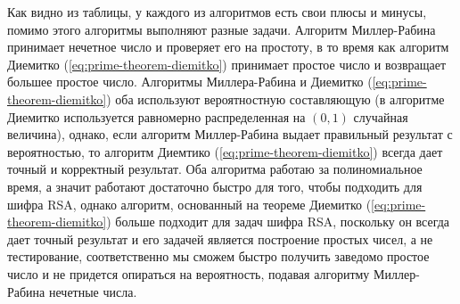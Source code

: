   Как видно из таблицы, у каждого из алгоритмов есть свои плюсы и минусы, помимо этого алгоритмы выполняют разные задачи. Алгоритм Миллер-Рабина принимает нечетное число и проверяет его на простоту, в то время как алгоритм Диемитко (\ref{eq:prime-theorem-diemitko}) принимает простое число и возвращает большее простое число. Алгоритмы Миллера-Рабина и Диемитко (\ref{eq:prime-theorem-diemitko}) оба используют вероятностную составляющую (в алгоритме Диемитко используется равномерно распределенная на $(0,1)$ случайная величина), однако, если алгоритм Миллер-Рабина выдает правильный результат с вероятностью, то алгоритм Диемтико (\ref{eq:prime-theorem-diemitko}) всегда дает точный и корректный результат. Оба алгоритма работаю за полиномиальное время, а значит работают достаточно быстро для того, чтобы подходить для шифра RSA, однако алгоритм, основанный на теореме Диемитко (\ref{eq:prime-theorem-diemitko}) больше подходит для задач шифра RSA, поскольку он всегда дает точный результат и его задачей является построение простых чисел, а не тестирование, соответственно мы сможем быстро получить заведомо простое число и не придется опираться на вероятность, подавая алгоритму Миллер-Рабина нечетные числа.






